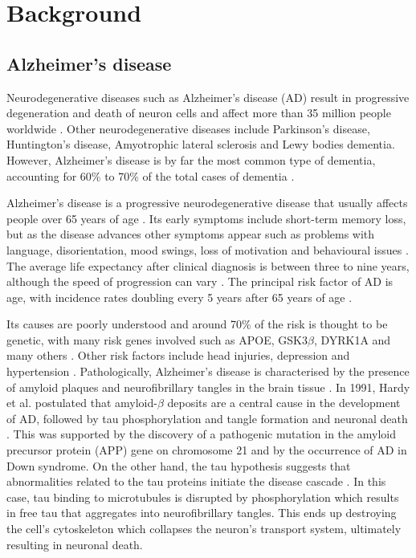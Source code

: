 \chapter{Background}
\label{chapter:background}

\section{Alzheimer's disease}
\label{sec:AD}

Neurodegenerative diseases such as Alzheimer's disease (AD) result in progressive degeneration and death of neuron cells and affect more than 35 million people worldwide \cite{querfurth2010mechanisms}. Other neurodegenerative diseases include Parkinson's disease, Huntington's disease, Amyotrophic lateral sclerosis and Lewy bodies dementia. However, Alzheimer's disease is by far the most common type of dementia, accounting for 60\% to 70\% of the total cases of dementia \cite{Burns2009,world2013dementia}.

Alzheimer's disease is a progressive neurodegenerative disease that usually affects people over 65 years of age \cite{Burns2009,world2013dementia}. Its early symptoms include short-term memory loss, but as the disease advances other symptoms appear such as problems with language, disorientation, mood swings, loss of motivation and behavioural issues \cite{Burns2009,world2013dementia}. The average life expectancy after clinical diagnosis is between three to nine years, although the speed of progression can vary \cite{querfurth2010mechanisms}. The principal risk factor of AD is age, with incidence rates doubling every 5 years after 65 years of age \cite{querfurth2010mechanisms,todd2013survival}. 

Its causes are poorly understood and around 70\% of the risk is thought to be genetic, with many risk genes involved such as APOE, GSK3$\beta$, DYRK1A and many others \cite{Ballard2011alzheimers}. Other risk factors include head injuries, depression and hypertension \cite{Burns2009}. Pathologically, Alzheimer's disease is characterised by the presence of amyloid plaques and neurofibrillary tangles in the brain tissue \cite{braak1991neuropathological}. In 1991, Hardy et al. postulated that amyloid-$\beta$ deposits are a central cause in the development of AD, followed by tau phosphorylation and tangle formation and neuronal death \cite{hardy1991amyloid}. This was supported by the discovery of a pathogenic mutation in the amyloid precursor protein (APP) gene on chromosome 21 and by the occurrence of AD in Down syndrome. On the other hand, the tau hypothesis suggests that abnormalities related to the tau proteins initiate the disease cascade \cite{mudher2002alzheimer}. In this case, tau binding to microtubules is disrupted by phosphorylation which results in free tau that aggregates into neurofibrillary tangles. This ends up destroying the cell's cytoskeleton which collapses the neuron's transport system, ultimately resulting in neuronal death. 

